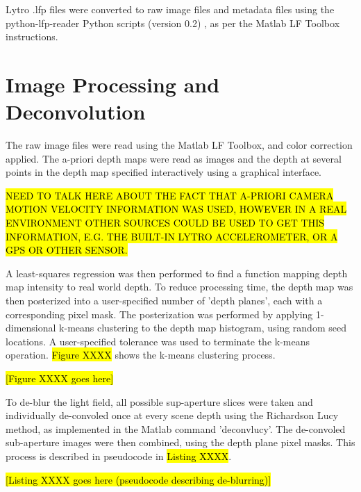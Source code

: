 Lytro .lfp files were converted to raw image files and metadata files using the python-lfp-reader Python scripts (version 0.2) \cite{esfahbod2013python}, as per the Matlab LF Toolbox instructions.


\section{Image Processing and Deconvolution}

The raw image files were read using the Matlab LF Toolbox, and color correction applied.
The a-priori depth maps were read as images and the depth at several points in the depth map specified interactively using a graphical interface.

\hl{NEED TO TALK HERE ABOUT THE FACT THAT A-PRIORI CAMERA MOTION VELOCITY INFORMATION WAS USED, HOWEVER IN A REAL ENVIRONMENT OTHER SOURCES COULD BE USED TO GET THIS INFORMATION, E.G. THE BUILT-IN LYTRO ACCELEROMETER, OR A GPS OR OTHER SENSOR.}

A least-squares regression was then performed to find a function mapping depth map intensity to real world depth.
To reduce processing time, the depth map was then posterized into a user-specified number of 'depth planes', each with a corresponding pixel mask.
The posterization was performed by applying 1-dimensional k-means clustering to the depth map histogram, using random seed locations.
A user-specified tolerance was used to terminate the k-means operation.
\hl{Figure XXXX} shows the k-means clustering process.

\hl{[Figure XXXX goes here]}

To de-blur the light field, all possible sup-aperture slices were taken and individually de-convoled once at every scene depth using the Richardson Lucy method, as implemented in the Matlab command 'deconvlucy'.
The de-convoled sub-aperture images were then combined, using the depth plane pixel masks.
This process is described in pseudocode in \hl{Listing XXXX}.

\hl{[Listing XXXX goes here (pseudocode describing de-blurring)]}


%
%    
%    
%    


